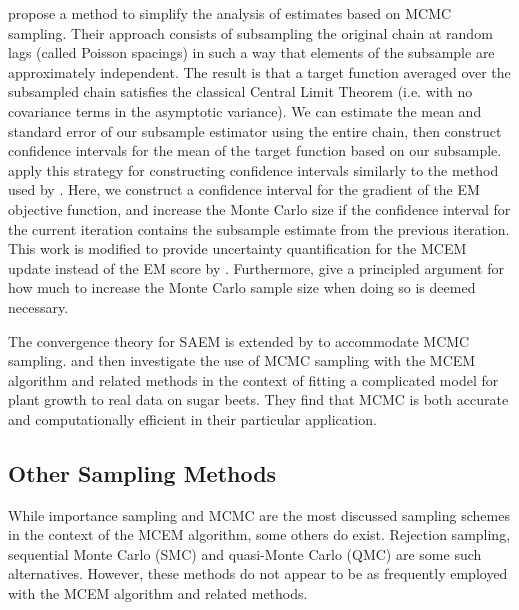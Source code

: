 \documentclass[11pt, oneside]{article}   	%
\begin{document}
\citet{Lev01} propose a method to simplify the analysis of estimates based on MCMC sampling. Their approach consists of subsampling the original chain at random lags (called Poisson spacings) in such a way that elements of the subsample are approximately independent. The result is that a target function averaged over the subsampled chain satisfies the classical Central Limit Theorem (i.e. with no covariance terms in the asymptotic variance). We can estimate the mean and standard error of our subsample estimator using the entire chain, then construct confidence intervals for the mean of the target function based on our subsample. \citeauthor{Lev01} apply this strategy for constructing confidence intervals similarly to the method used by \citet{Boo99}. Here, we construct a confidence interval for the gradient of the EM objective function, and increase the Monte Carlo size if the confidence interval for the current iteration contains the subsample estimate from the previous iteration. This work is modified to provide uncertainty quantification for the MCEM update instead of the EM score by \citet{Lev04}. Furthermore, \citeauthor{Lev04} give a principled argument for how much to increase the Monte Carlo sample size when doing so is deemed necessary.

The convergence theory for SAEM is extended by \citet{Kuh04} to accommodate MCMC sampling. \citet{Tre14} and \citet{Bae16} then investigate the use of MCMC sampling with the MCEM algorithm and related methods in the context of fitting a complicated model for plant growth to real data on sugar beets. They find that MCMC is both accurate and computationally efficient in their particular application.


\subsection{Other Sampling Methods} \label{sec:other_samplers}

While importance sampling and MCMC are the most discussed sampling schemes in the context of the MCEM algorithm, some others do exist. Rejection sampling, sequential Monte Carlo (SMC) and quasi-Monte Carlo (QMC) are some such alternatives. However, these methods do not appear to be as frequently employed with the MCEM algorithm and related methods.
\end{document}

